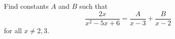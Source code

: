 Find constants $A$ and $B$ such that
\[
\dfrac{2x}{x^2-5x+6}=\dfrac{A}{x-3}+\dfrac{B}{x-2}
\]
for all $x\ne2,3$.
